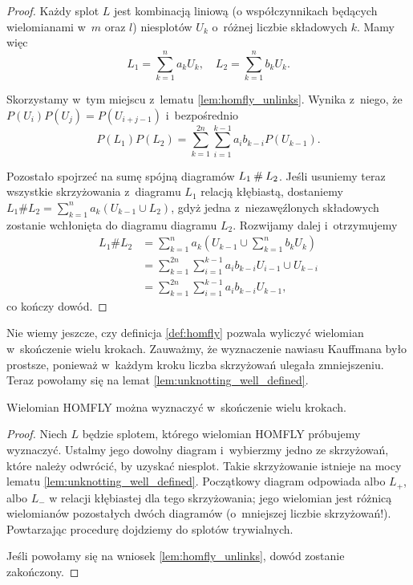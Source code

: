 \begin{proof}
    Każdy splot $L$ jest kombinacją liniową (o współczynnikach będących wielomianami w~$m$ oraz $l$) niesplotów $U_k$ o~różnej liczbie składowych $k$.
    Mamy więc
    \begin{equation}
        L_1 = \sum_{k=1}^n a_k U_k, \quad
        L_2 = \sum_{k=1}^n b_k U_k.
    \end{equation}

    Skorzystamy w~tym miejscu z~lematu \ref{lem:homfly_unlinks}.
    Wynika z~niego, że $P(U_i)P(U_j) = P(U_{i+j-1})$ i~bezpośrednio
    \begin{equation}
        P(L_1)P(L_2) = \sum_{k=1}^{2n} \sum_{i=1}^{k-1} a_i b_{k-i}P(U_{k-1}).
    \end{equation}

    Pozostało spojrzeć na sumę spójną diagramów  $L_1 \mathbin{\#} L_2$.
    Jeśli usuniemy teraz wszystkie skrzyżowania z~diagramu $L_1$ relacją kłębiastą, dostaniemy $L_1 \# L_2 = \sum_{k=1}^n a_k (U_{k-1} \cup L_2)$, gdyż jedna z~niezawęźlonych składowych zostanie wchłonięta do diagramu diagramu $L_2$.
    Rozwijamy dalej i~otrzymujemy
    \begin{align}
        L_1 \# L_2
        & = \sum_{k=1}^n a_k \left(U_{k-1} \cup \sum_{k=1}^n b_k U_k\right) \\
        & = \sum_{k=1}^{2n} \sum_{i=1}^{k-1} a_i b_{k-i} U_{i-1} \cup U_{k-i} \\
        & = \sum_{k=1}^{2n} \sum_{i=1}^{k-1} a_i b_{k-i} U_{k-1},
    \end{align}
    co kończy dowód.
\end{proof}

Nie wiemy jeszcze, czy definicja \ref{def:homfly} pozwala wyliczyć wielomian w~skończenie wielu krokach. %
Zauważmy, że wyznaczenie nawiasu Kauffmana było prostsze, ponieważ w~każdym kroku liczba skrzyżowań ulegała zmniejszeniu.
Teraz powołamy się na lemat \ref{lem:unknotting_well_defined}.

\begin{proposition}
    Wielomian HOMFLY można wyznaczyć w~skończenie wielu krokach.
\end{proposition}

\begin{proof}
    Niech $L$ będzie splotem, którego wielomian HOMFLY próbujemy wyznaczyć.
    Ustalmy jego dowolny diagram i~wybierzmy jedno ze skrzyżowań, które należy odwrócić, by uzyskać niesplot.
    Takie skrzyżowanie istnieje na mocy lematu \ref{lem:unknotting_well_defined}.
    Początkowy diagram odpowiada albo $L_+$, albo $L_-$ w relacji kłębiastej dla tego skrzyżowania; jego wielomian jest różnicą wielomianów pozostałych dwóch diagramów (o~mniejszej liczbie skrzyżowań!).
    Powtarzając procedurę dojdziemy do splotów trywialnych.

    Jeśli powołamy się na wniosek \ref{lem:homfly_unlinks}, dowód zostanie zakończony.
\end{proof}

